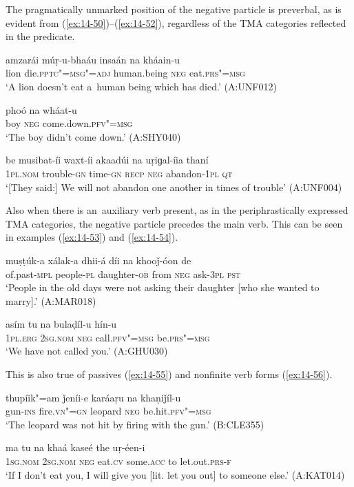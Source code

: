 The pragmatically unmarked position of the negative particle is preverbal, as is evident from (\ref{ex:14-50})--(\ref{ex:14-52}), regardless of the TMA categories reflected in the predicate.

\begin{exe}
\ex
\label{ex:14-50}
\gll amzarái múṛ-u-bhaáu insaán na kháain-u \\
lion die.\textsc{pptc"=msg"=adj} human.being \textsc{neg} eat.\textsc{prs"=msg} \\
\glt `A lion doesn't eat a~human being which has died.' (A:UNF012)

\ex
\label{ex:14-51}
\gll phoó na wháat-u \\
boy \textsc{neg} come.down.\textsc{pfv"=msg } \\
\glt `The boy didn't come down.' (A:SHY040)

\ex
\label{ex:14-52}
\gll be musibat-íi waxt-íi akaadúi na uṛiɡal-íia  thaní \\
\textsc{1pl.nom} trouble-\textsc{gn} time-\textsc{gn} \textsc{recp} \textsc{neg} abandon-\textsc{1pl} \textsc{qt} \\
\glt `[They said:] We will not abandon one another in times of trouble' (A:UNF004)
\end{exe}

Also when there is an~auxiliary verb present, as in the periphrastically expressed TMA categories, the negative particle precedes the main verb. This can be seen in examples (\ref{ex:14-53}) and (\ref{ex:14-54}).

\begin{exe}
\ex
\label{ex:14-53}
\gll muṣṭúk-a xálak-a dhii-á díi na  khooǰ-óon de \\
of.past-\textsc{mpl} people-\textsc{pl} daughter-\textsc{ob} from \textsc{neg} ask-\textsc{3pl} \textsc{pst}  \\
\glt `People in the old days were not asking their daughter [who she wanted to marry].' (A:MAR018)

\ex
\label{ex:14-54}
\gll asím tu na bulaḍíl-u hín-u \\
\textsc{1pl.erg} \textsc{2sg.nom} \textsc{neg} call.\textsc{pfv"=msg} be.\textsc{prs"=msg} \\
\glt `We have not called you.' (A:GHU030)
\end{exe}

This is also true of passives (\ref{ex:14-55}) and nonfinite verb forms (\ref{ex:14-56}).

\begin{exe}
\ex
\label{ex:14-55}
\gll thupíik"=am ǰeníi-e karáaṛu na khaṇiǰíl-u \\
gun-\textsc{ins} fire.\textsc{vn"=gn} leopard \textsc{neg} be.hit.\textsc{pfv"=msg}  \\
\glt `The leopard was not hit by firing with the gun.' (B:CLE355)

\ex
\label{ex:14-56}
\gll ma tu na khaá kaseé  the uṛ-éen-i \\
\textsc{1sg.nom} \textsc{2sg.nom} \textsc{neg} eat.\textsc{cv} some.\textsc{acc} to let.out.\textsc{prs-f} \\
\glt `If I don't eat you, I will give you [lit. let you out] to someone else.' (A:KAT014)
\end{exe}

